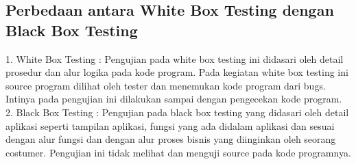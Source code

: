 \documentclass{article}
\begin{document}
\subsection { Perbedaan antara White Box Testing dengan Black Box Testing}
1.	White Box Testing :
 Pengujian pada white box testing ini didasari oleh detail prosedur dan alur logika pada kode program. Pada kegiatan white box testing ini source program dilihat oleh tester dan menemukan kode program dari bugs. Intinya pada pengujian ini dilakukan sampai dengan pengecekan kode program. 
2.	Black Box Testing : 
Pengujian pada black box testing yang didasari oleh detail aplikasi seperti tampilan aplikasi, fungsi yang ada didalam aplikasi dan sesuai dengan alur fungsi  dan dengan alur proses bisnis yang diinginkan oleh seorang costumer. Pengujian ini  tidak melihat dan menguji source pada kode programnya. 
\end{document}
